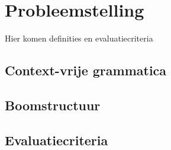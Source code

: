 \documentclass[Main.tex]{subfiles}
\begin{document}
\section{Probleemstelling}
Hier komen definities en evaluatiecriteria
\subsection{Context-vrije grammatica}
\subsection{Boomstructuur}
\subsection{Evaluatiecriteria}
\end{document}

